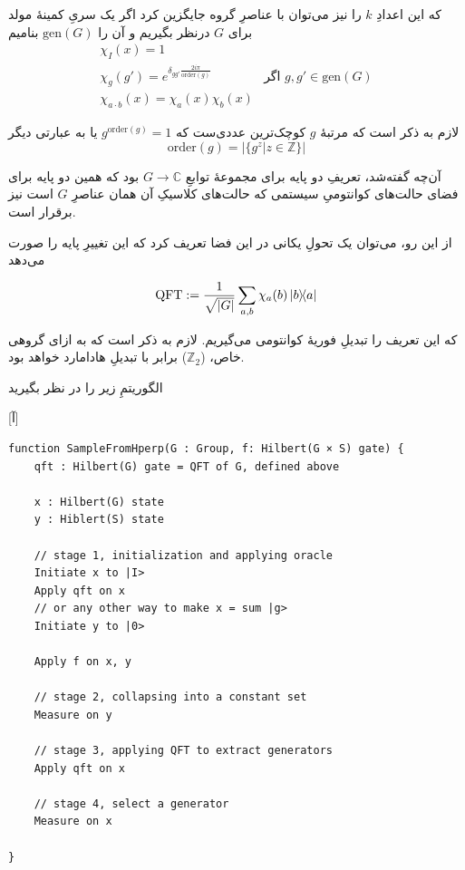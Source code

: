 \documentclass[a4paper,12pt]{article}
\begin{document}
که این اعدادِ \(k\) را نیز می‌توان با عناصرِ گروه جایگزین کرد اگر یک سریِ کمینهٔ مولد برای \(G\) درنظر بگیریم و آن را 
\(\mathrm{gen}(G)\)
بنامیم
\begin{eqnarray}
\chi_I(x) = 1 \\
\chi_g(g') = e^{\delta_{gg'}\frac{2i\pi}{\mathrm{order}(g)}} & \text{اگر \(g, g' \in \mathrm{gen}(G)\)} \\
\chi_{a \cdot b}(x) = \chi_a(x) \chi_b(x) 
\end{eqnarray}

لازم به ذکر است که مرتبهٔ \(g\) کوچک‌ترین عددی‌ست که \(g^{\mathrm{order}(g)} = 1\) یا به عبارتی دیگر
\begin{equation}
    \mathrm{order}(g) = |\{ g^z | z \in \mathbb{Z}\}|
\end{equation}

آن‌چه گفته‌شد، تعریفِ دو پایه برای مجموعهٔ توابعِ \(G \to \mathbb{C}\) بود که همین دو پایه برای فضای حالت‌های کوانتومیِ سیستمی که حالت‌های کلاسیکِ آن همان عناصرِ \(G\) است نیز برقرار است.

از این رو، می‌توان یک تحولِ یکانی در این فضا تعریف کرد که این تغییرِ پایه را صورت می‌دهد

\begin{equation}
    \mathrm{QFT} := \frac{1}{\sqrt{\abs{G}}} \sum_{a, b} \chi_a(b) \dyad{b}{a}  
\end{equation}

که این تعریف را تبدیلِ فوریهٔ کوانتومی می‌گیریم. لازم به ذکر است که به ازای گروهی خاص، (\(\mathbb{Z}_2\)) برابر با تبدیلِ هادامارد خواهد بود.

الگوریتمِ زیر را در نظر بگیرید

[آ]

\begin{latin}
\begin{lstlisting}
function SampleFromHperp(G : Group, f: Hilbert(G × S) gate) {
    qft : Hilbert(G) gate = QFT of G, defined above
    
    x : Hilbert(G) state
    y : Hiblert(S) state
    
    // stage 1, initialization and applying oracle
    Initiate x to |I>
    Apply qft on x
    // or any other way to make x = sum |g>
    Initiate y to |0>
    
    Apply f on x, y
    
    // stage 2, collapsing into a constant set
    Measure on y
    
    // stage 3, applying QFT to extract generators
    Apply qft on x
    
    // stage 4, select a generator
    Measure on x
     
}
\end{lstlisting}
\end{latin}
\end{document}
